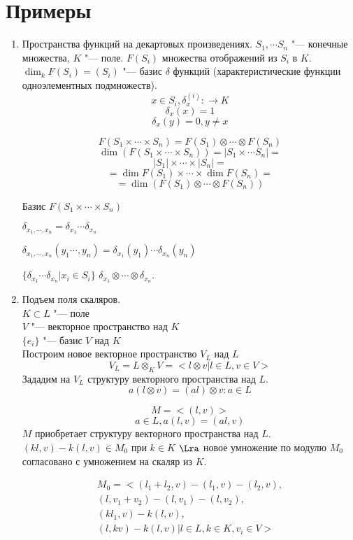 ﻿\section{Примеры}
\begin{enumerate}
    \item Пространства функций на декартовых произведениях. 
    $S_1, \cdots S_n$ "--- конечные множества, $K$ "--- поле. 
    $F(S_i)$ множества отображений из $S_i$ в $K$.
    $\dim_k F(S_i) = (S_i)$ "--- базис $\delta$ функций (характеристические функции одноэлементных подмножеств).
    $$x \in S_i, \delta_{x}^{(i)} \colon \to K$$
    $$\delta_{x}(x) = 1$$
    $$\delta_{x}(y) = 0, y \ne x$$

    $$F(S_1 \times \cdots \times S_n) = F(S_1) \otimes \cdots \otimes F(S_n)$$
    $$\dim(F(S_1 \times \cdots \times S_n)) = |S_1 \times \cdots S_n| = $$
    $$|S_1| \times \cdots \times |S_n| = $$
    $$= \dim F(S_1) \times \cdots \times \dim F(S_n) = $$
    $$= \dim (F(S_1) \otimes \cdots \otimes F(S_n))$$

    Базис $F(S_1 \times \cdots \times S_n)$

    $\delta_{x_1, \cdots, x_n} = \delta_{x_1} \cdots \delta_{x_n}$

    $\delta_{x_1, \cdots, x_n}(y_1 \cdots, y_n) = \delta_{x_1}(y_1) \cdots \delta_{x_n}(y_n)$

    $\{\delta_{x_1} \cdots \delta_{x_n}| x_i \in S_i\}$ 
    $\delta_{x_1} \otimes \cdots \otimes \delta_{x_n}$.
\item
Подъем поля скаляров.\\
$K \subset L$ "--- поле\\
$V$ "--- векторное пространство над $K$\\
$\{e_i\}$ "--- базис $V$ над $K$\\
Построим новое векторное пространство $V_L$ над $L$\\
$$V_L = L \otimes_{K} V = < l \otimes v | l \in L, v \in V >$$
Зададим на $V_L$ структуру векторного пространства над $L$.
$$a(l \otimes v) = (al) \otimes v \colon a \in L $$

$$M = <(l, v)>$$
$$a \in L, a(l,v) = (al, v)$$
$M$ приобретает структуру векторного пространства над $L$.
$(kl, v) - k(l, v) \in M_0$ при $k \in K$ $\Lra$ новое умножение 
по модулю $M_0$ согласовано с умножением на скаляр из $K$.

\begin{gather*}
M_0 = <(l_1 + l_2, v) - (l_1, v) - (l_2, v), \\
         (l, v_1 + v_2) - (l, v_1) - (l, v_2), \\
         (kl_1, v) - k(l, v),\\ 
         (l, kv) - k(l, v) | l \in L, k \in K, v_i \in V>
\end{gather*}


\end{enumerate}
